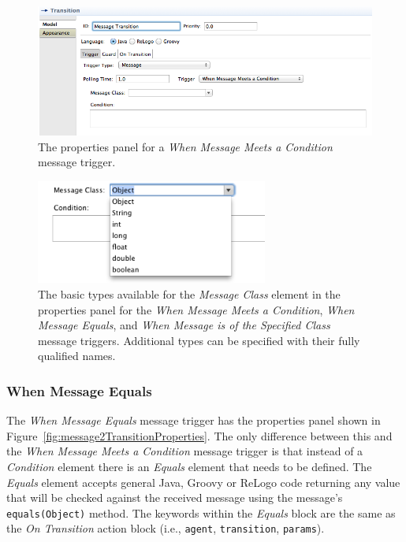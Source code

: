 \documentclass[11pt]{amsart}
\begin{document}
\begin{figure}
\begin{center}
\vspace{.2in}
\centerline {
\includegraphics[width=5in]{StatechartsImages/Message1TransitionProperties.png}
}
\caption{The properties panel for a \emph{When Message Meets a Condition} message trigger.}
\label{fig:message1TransitionProperties}
\end{center}
\end{figure}

\begin{figure}
\begin{center}
\vspace{.2in}
\centerline {
\includegraphics[width=3.0in]{StatechartsImages/MessageClassType.png}
}
\caption{The basic types available for the \emph{Message Class} element in the properties panel for the \emph{When Message Meets a Condition}, \emph{When Message Equals}, and \emph{When Message is of the Specified Class} message triggers. Additional types can be specified with their fully qualified names.}
\label{fig:messageClassType}
\end{center}
\end{figure}
\clearpage


\subsubsection{When Message Equals}
The \emph{When Message Equals} message trigger has the properties panel shown in Figure~\ref{fig:message2TransitionProperties}. The only difference between this and the \emph{When Message Meets a Condition} message trigger is that instead of a \emph{Condition} element there is an \emph{Equals} element that needs to be defined. The \emph{Equals} element accepts general Java, Groovy or ReLogo code returning any value that will be checked against the received message using the message's \texttt{equals(Object)} method. The keywords within the \emph{Equals} block are the same as the \emph{On Transition} action block (i.e., \texttt{agent}, \texttt{transition}, \texttt{params}).
\end{document}
